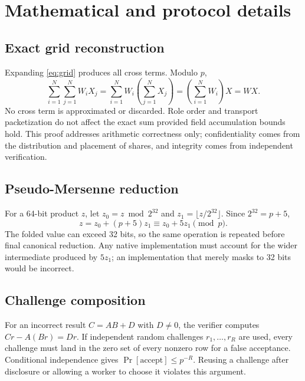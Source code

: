 \section{Mathematical and protocol details}\label{app:math}

\subsection{Exact grid reconstruction}

Expanding \cref{eq:grid} produces all cross terms. Modulo $p$,
\begin{equation}
\sum_{i=1}^{N}\sum_{j=1}^{N}W_iX_j
=\sum_{i=1}^{N}W_i\left(\sum_{j=1}^{N}X_j\right)
=\left(\sum_{i=1}^{N}W_i\right)X=WX.
\end{equation}
No cross term is approximated or discarded. Role order and transport packetization do not affect the exact sum provided field accumulation bounds hold. This proof addresses arithmetic correctness only; confidentiality comes from the distribution and placement of shares, and integrity comes from independent verification.

\subsection{Pseudo-Mersenne reduction}

For a 64-bit product $z$, let $z_0=z\bmod2^{32}$ and $z_1=\lfloor z/2^{32}\rfloor$. Since $2^{32}=p+5$,
\begin{equation}
z=z_0+(p+5)z_1\equiv z_0+5z_1\pmod p.
\end{equation}
The folded value can exceed 32 bits, so the same operation is repeated before final canonical reduction. Any native implementation must account for the wider intermediate produced by $5z_1$; an implementation that merely masks to 32 bits would be incorrect.

\subsection{Challenge composition}

For an incorrect result $C=AB+D$ with $D\neq0$, the verifier computes $Cr-A(Br)=Dr$. If independent random challenges $r_1,\ldots,r_R$ are used, every challenge must land in the zero set of every nonzero row for a false acceptance. Conditional independence gives $\Pr[\mathrm{accept}]\leq p^{-R}$. Reusing a challenge after disclosure or allowing a worker to choose it violates this argument.

